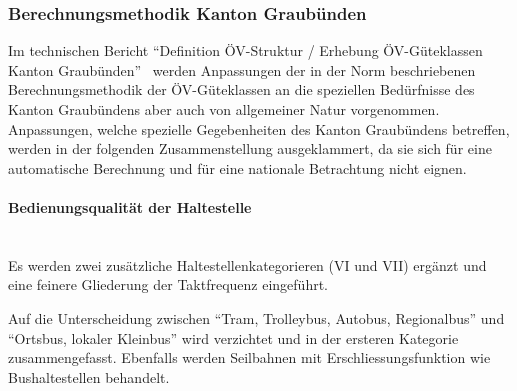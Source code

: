 \subsubsection{Berechnungsmethodik Kanton Graubünden}
\label{Lösungsansätze:Berechnungsmethodik Kanton Graubünden}
Im technischen Bericht "`Definition \acs{ÖV}-Struktur / Erhebung  \acs{ÖV}-Güteklassen Kanton Graubünden"'~\cite{oev-guteklasse-gr} werden Anpassungen der in der Norm beschriebenen Berechnungsmethodik der \acs{ÖV}-Güteklassen an die speziellen Bedürfnisse des Kanton Graubündens aber auch von allgemeiner Natur vorgenommen.
Anpassungen, welche spezielle Gegebenheiten des Kanton Graubündens betreffen, werden in der folgenden Zusammenstellung ausgeklammert, da sie sich für eine automatische Berechnung und für eine nationale Betrachtung nicht eignen.

\paragraph{Bedienungsqualität der Haltestelle}~\\
\label{Berechnungsmethodik Kanton Graubünden:Bedienungsqualität der Haltestelle}
Es werden zwei zusätzliche Haltestellenkategorieren (VI und VII) ergänzt und eine feinere Gliederung der Taktfrequenz eingeführt.

Auf die Unterscheidung zwischen "`Tram, Trolleybus, Autobus, Regionalbus"' und "`Ortsbus, lokaler Kleinbus"' wird verzichtet und in der ersteren Kategorie zusammengefasst.
Ebenfalls werden Seilbahnen mit Erschliessungsfunktion wie Bushaltestellen behandelt.

